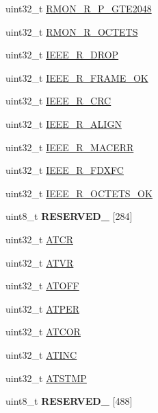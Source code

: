 \begin{DoxyCompactItemize}
\item 
uint32\+\_\+t \hyperlink{struct_e_n_e_t___mem_map_aa4563dd2afa7ab3ebe43fedd2d27fb23}{R\+M\+O\+N\+\_\+\+R\+\_\+\+P\+\_\+\+G\+T\+E2048}
\item 
uint32\+\_\+t \hyperlink{struct_e_n_e_t___mem_map_ade43f1c7d06cb604d1f24ba45bf1ec10}{R\+M\+O\+N\+\_\+\+R\+\_\+\+O\+C\+T\+E\+T\+S}
\item 
uint32\+\_\+t \hyperlink{struct_e_n_e_t___mem_map_ab6094b200bfd511ba0565eb3998d84a7}{I\+E\+E\+E\+\_\+\+R\+\_\+\+D\+R\+O\+P}
\item 
uint32\+\_\+t \hyperlink{struct_e_n_e_t___mem_map_a396a5dcad9d98a3ce3da0bcef50b48a8}{I\+E\+E\+E\+\_\+\+R\+\_\+\+F\+R\+A\+M\+E\+\_\+\+O\+K}
\item 
uint32\+\_\+t \hyperlink{struct_e_n_e_t___mem_map_a2255a62e6e3613228e51e17de6fa7857}{I\+E\+E\+E\+\_\+\+R\+\_\+\+C\+R\+C}
\item 
uint32\+\_\+t \hyperlink{struct_e_n_e_t___mem_map_a039b0879213c4f8df06320fd59ec98b5}{I\+E\+E\+E\+\_\+\+R\+\_\+\+A\+L\+I\+G\+N}
\item 
uint32\+\_\+t \hyperlink{struct_e_n_e_t___mem_map_a32fe60418cc1e6ca03e3fbede8ae3fd0}{I\+E\+E\+E\+\_\+\+R\+\_\+\+M\+A\+C\+E\+R\+R}
\item 
uint32\+\_\+t \hyperlink{struct_e_n_e_t___mem_map_ae17f87f4ba066274bc113b3dfac5a635}{I\+E\+E\+E\+\_\+\+R\+\_\+\+F\+D\+X\+F\+C}
\item 
uint32\+\_\+t \hyperlink{struct_e_n_e_t___mem_map_ad80de3963e00bd1d815615de321b1ee4}{I\+E\+E\+E\+\_\+\+R\+\_\+\+O\+C\+T\+E\+T\+S\+\_\+\+O\+K}
\item 
\hypertarget{struct_e_n_e_t___mem_map_a9104d6e3e04b5a7b8a629eb1779df9ae}{}uint8\+\_\+t {\bfseries R\+E\+S\+E\+R\+V\+E\+D\+\_} \mbox{[}284\mbox{]}\label{struct_e_n_e_t___mem_map_a9104d6e3e04b5a7b8a629eb1779df9ae}

\item 
uint32\+\_\+t \hyperlink{struct_e_n_e_t___mem_map_ae40c9947b7abaac3841ec7e9ec218ba1}{A\+T\+C\+R}
\item 
uint32\+\_\+t \hyperlink{struct_e_n_e_t___mem_map_a28e2d519809c574a0b4c3161bfe16545}{A\+T\+V\+R}
\item 
uint32\+\_\+t \hyperlink{struct_e_n_e_t___mem_map_a34292bff9f9d70253953a1814ce46991}{A\+T\+O\+F\+F}
\item 
uint32\+\_\+t \hyperlink{struct_e_n_e_t___mem_map_a37be83627f6f5f7fb967292d2f53e294}{A\+T\+P\+E\+R}
\item 
uint32\+\_\+t \hyperlink{struct_e_n_e_t___mem_map_a2f114451bf05d53f6076180683097164}{A\+T\+C\+O\+R}
\item 
uint32\+\_\+t \hyperlink{struct_e_n_e_t___mem_map_a9456f8f8040c7789e37035dc19caee16}{A\+T\+I\+N\+C}
\item 
uint32\+\_\+t \hyperlink{struct_e_n_e_t___mem_map_afc576420775d6124f0ed3ced438ba89e}{A\+T\+S\+T\+M\+P}
\item 
\hypertarget{struct_e_n_e_t___mem_map_a679c01095d7b0e0c241aae75269496e8}{}uint8\+\_\+t {\bfseries R\+E\+S\+E\+R\+V\+E\+D\+\_} \mbox{[}488\mbox{]}\label{struct_e_n_e_t___mem_map_a679c01095d7b0e0c241aae75269496e8}


\end{DoxyCompactItemize}

